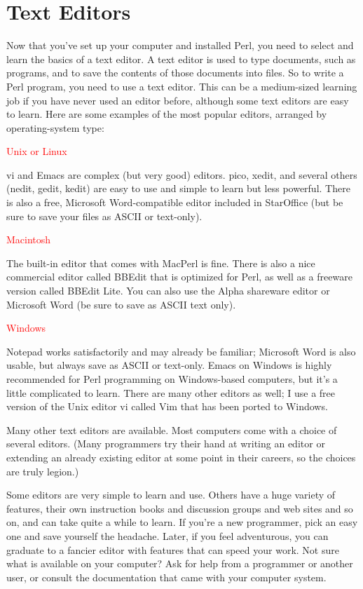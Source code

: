 \section{Text Editors}
Now that you've set up your computer and installed Perl, you need to select and learn the basics of a text editor. A text editor is used to type documents, such as programs, and to save the contents of those documents into files. So to write a Perl program, you need to use a text editor. This can be a medium-sized learning job if you have never used an editor before, although some text editors are easy to learn. Here are some examples of the most popular editors, arranged by operating-system type:

\textcolor{red}{Unix or Linux}
\begin{adjustwidth}{1cm}{}
vi and Emacs are complex (but very good) editors. pico, xedit, and several others (nedit, gedit, kedit) are easy to use and simple to learn but less powerful. There is also a free, Microsoft Word-compatible editor included in StarOffice (but be sure to save your files as ASCII or text-only).
\end{adjustwidth}

\textcolor{red}{Macintosh}
\begin{adjustwidth}{1cm}{}
The built-in editor that comes with MacPerl is fine. There is also a nice commercial editor called BBEdit that is optimized for Perl, as well as a freeware version called BBEdit Lite. You can also use the Alpha shareware editor or Microsoft Word (be sure to save as ASCII text only).
\end{adjustwidth}

\textcolor{red}{Windows}
\begin{adjustwidth}{1cm}{}
Notepad works satisfactorily and may already be familiar; Microsoft Word is also usable, but always save as ASCII or text-only. Emacs on Windows is highly recommended for Perl programming on Windows-based computers, but it's a little complicated to learn. There are many other editors as well; I use a free version of the Unix editor vi called Vim that has been ported to Windows.
\end{adjustwidth}

Many other text editors are available. Most computers come with a choice of several editors. (Many programmers try their hand at writing an editor or extending an already existing editor at some point in their careers, so the choices are truly legion.)

Some editors are very simple to learn and use. Others have a huge variety of features, their own instruction books and discussion groups and web sites and so on, and can take quite a while to learn. If you're a new programmer, pick an easy one and save yourself the headache. Later, if you feel adventurous, you can graduate to a fancier editor with features that can speed your work. Not sure what is available on your computer? Ask for help from a programmer or another user, or consult the documentation that came with your computer system. 

